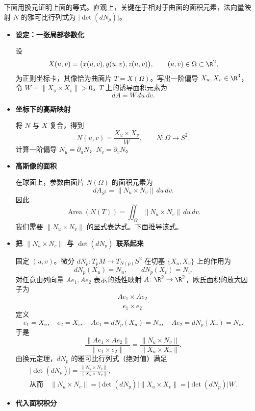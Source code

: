 下面用换元证明上面的等式。直观上，关键在于相对于曲面的面积元素，法向量映射 $N$ 的雅可比行列式为 $\lvert\det(dN_p)\rvert$。
\begin{itemize}
  \item \textbf{设定：一张局部参数化}

  设
  \[
    X(u,v)=\bigl(x(u,v),y(u,v),z(u,v)\bigr),\qquad
    (u,v)\in\Omega\subset\R^2,
  \]
  为正则坐标卡，其像恰为曲面片 $T=X(\Omega)$。写出一阶偏导 $X_u,X_v\in\R^3$，令
  $W=\lVert X_u\times X_v\rVert>0$。$T$ 上的诱导面积元素为
  \begin{equation*}
    dA=W\,du\,dv.
    \tag{5A1}\label{eq:5A1}
  \end{equation*}
  \item \textbf{坐标下的高斯映射}

  将 $N$ 与 $X$ 复合，得到
  \[
    N(u,v)=\frac{X_u\times X_v}{W},\qquad N\colon\Omega\to S^2.
  \]
  计算一阶偏导 $N_u=\partial_uN$，$N_v=\partial_vN$。
  \item \textbf{高斯像的面积}

  在球面上，参数曲面片 $N(\Omega)$ 的面积元素为
  \[
    dA_{S^2}=\lVert N_u\times N_v\rVert\,du\,dv.
  \]
  因此
  \begin{equation*}
    \operatorname{Area}(N(T))=\iint_\Omega \lVert N_u\times N_v\rVert\,du\,dv.
    \tag{5A2}\label{eq:5A2}
  \end{equation*}
  我们需要 $\lVert N_u\times N_v\rVert$ 的显式表达式。下面推导该式。
  \item \textbf{把 $\lVert N_u\times N_v\rVert$ 与 $\det(dN_p)$ 联系起来}

  固定 $(u,v)$。微分 $dN_p\colon T_pM\to T_{N(p)}S^2$ 在切基 $\{X_u,X_v\}$ 上的作用为
  \[
    dN_p(X_u)=N_u,\qquad dN_p(X_v)=N_v.
  \]
  对任意由列向量 $Ae_1,Ae_2$ 表示的线性映射 $A\colon\R^2\to\R^2$，欧氏面积的放大因子为
  \[
    \frac{Ae_1\times Ae_2}{e_1\times e_2}.
  \]
  定义
  \[
    e_1=X_u,\quad e_2=X_v,\quad Ae_1=dN_p(X_u)=N_u,\quad
      Ae_2=dN_p(X_v)=N_v.
  \]
  于是
  \[
    \frac{\lVert Ae_1\times Ae_2\rVert}{\lVert e_1\times e_2\rVert}
       =\frac{\lVert N_u\times N_v\rVert}{\lVert X_u\times X_v\rVert}.
  \]
  由换元定理，$dN_p$ 的雅可比行列式（绝对值）满足
  \begin{equation*}
    \begin{gathered}
      \lvert\det(dN_p)\rvert
         =\frac{\lVert N_u\times N_v\rVert}{\lVert X_u\times X_v\rVert},\\
      \text{从而}\quad\lVert N_u\times N_v\rVert
         =\lvert\det(dN_p)\rvert\lVert X_u\times X_v\rVert
         =\lvert\det(dN_p)\rvert W.
    \end{gathered}
    \tag{5A3}\label{eq:5A3}
  \end{equation*}
  \item \textbf{代入面积积分}


\end{itemize}
